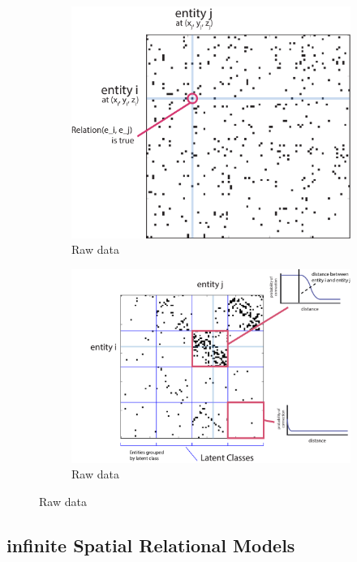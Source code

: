 \documentclass{article}
\begin{document}
\begin{figure}
  \centering 
  \begin{subfigure}[b]{0.4\textwidth}
    \includegraphics[width=\textwidth]{f1.raw.pdf}
    \caption{Raw data}
    \label{fig:gull}
  \end{subfigure}
  \begin{subfigure}[b]{0.55\textwidth}
    \includegraphics[width=\textwidth]{f1.sorted.pdf}
    \caption{Raw data}
    \label{fig:gull}
  \end{subfigure}
\end{figure}

\subsection{infinite Spatial Relational Models}
\end{document}
